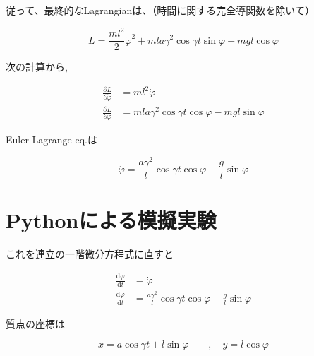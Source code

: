 従って、最終的なLagrangianは、（時間に関する完全導関数を除いて）

\[L=\displaystyle\frac{ml^2}{2}\dot{\varphi}^2+mla\gamma^2\cos\gamma t\sin\varphi + mgl\cos\varphi\]

次の計算から,

\begin{align*}
   \frac{\partial L}{\partial \dot{\varphi}} &= ml^2\dot{\varphi}\\
   \frac{\partial L}{\partial \varphi} &= mla\gamma^2\cos\gamma t\cos\varphi - mgl\sin\varphi
\end{align*}

Euler-Lagrange eq.は

\[\ddot{\varphi}=\displaystyle\frac{a\gamma^2}{l}\cos\gamma t\cos\varphi - \frac{g}{l}\sin\varphi\]

\section{Pythonによる模擬実験}

これを連立の一階微分方程式に直すと

\begin{align*}
   \frac{\mathrm{d}\varphi}{\mathrm{d}t} &= \dot{\varphi}\\
   \frac{\mathrm{d}\dot{\varphi}}{\mathrm{d}t} &= \frac{a\gamma^2}{l}\cos\gamma t\cos\varphi - \frac{g}{l}\sin\varphi
\end{align*}

質点の座標は

\[x=a\cos\gamma t + l\sin\varphi \qquad,\quad y=l\cos\varphi\]

\lstset{escapechar=@,style=custompy}

